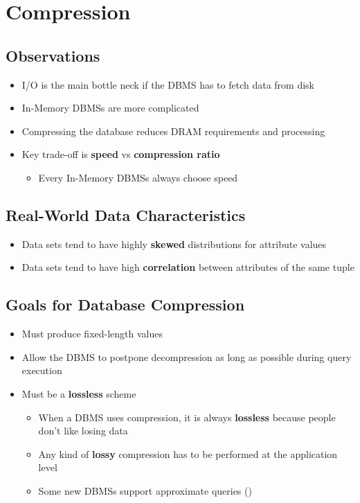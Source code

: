 \documentclass[11pt]{article}
\begin{document}
\section{Compression}

    \subsection*{Observations}
    \begin{itemize}
        \item I/O is the main bottle neck if the DBMS has to fetch data from disk
        \item In-Memory DBMSs are more complicated
        \item Compressing the database reduces DRAM requirements and processing
        \item Key trade-off is \textbf{speed} vs \textbf{compression ratio}
        \begin{itemize}
            \item Every In-Memory DBMSs always choose speed
        \end{itemize}
    \end{itemize}

    \subsection*{Real-World Data Characteristics}
    \begin{itemize}
        \item Data sets tend to have highly \textbf{skewed} distributions for attribute values
        \item Data sets tend to have high \textbf{correlation} between attributes of the same tuple
    \end{itemize}

    \subsection*{Goals for Database Compression}
    \begin{itemize}
        \item Must produce fixed-length values
        \item Allow the DBMS to postpone decompression as long as possible during query execution
        \item Must be a \textbf{lossless} scheme
        \begin{itemize}
            \item When a DBMS uses compression, it is always \textbf{lossless} because people don't like losing data
            \item Any kind of \textbf{lossy} compression has to be performed at the application level
            \item Some new DBMSs support approximate queries ()
        \end{itemize}
    \end{itemize}
\end{document}
